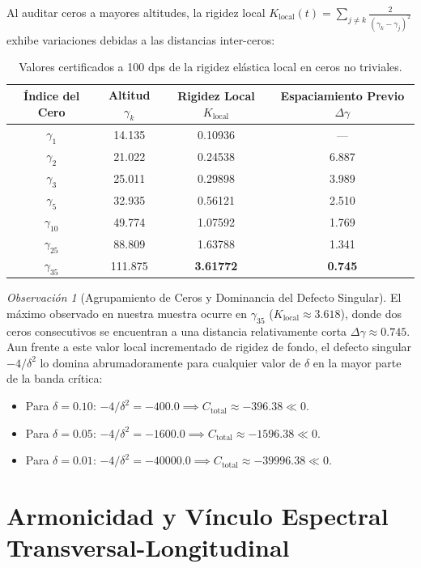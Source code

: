 \documentclass[11pt,a4paper]{article}
\theoremstyle{definition}
\theoremstyle{remark}
\newtheorem{remark}[theorem]{Observación}
\begin{document}
Al auditar ceros a mayores altitudes, la rigidez local $K_{\text{local}}(t) = \sum_{j \neq k} \frac{2}{(\gamma_k - \gamma_j)^2}$ exhibe variaciones debidas a las distancias inter-ceros:
\begin{table}[h!]
\centering
\begin{tabular}{@{}cccc@{}}
\toprule
\textbf{Índice del Cero} & \textbf{Altitud $\gamma_k$} & \textbf{Rigidez Local $K_{\text{local}}$} & \textbf{Espaciamiento Previo $\Delta \gamma$} \\ \midrule
$\gamma_1$  & 14.135 & 0.10936 & --- \\
$\gamma_2$  & 21.022 & 0.24538 & 6.887 \\
$\gamma_3$  & 25.011 & 0.29898 & 3.989 \\
$\gamma_5$  & 32.935 & 0.56121 & 2.510 \\
$\gamma_{10}$ & 49.774 & 1.07592 & 1.769 \\
$\gamma_{25}$ & 88.809 & 1.63788 & 1.341 \\
$\gamma_{35}$ & 111.875 & \textbf{3.61772} & \textbf{0.745} \\ \bottomrule
\end{tabular}
\caption{Valores certificados a 100 dps de la rigidez elástica local en ceros no triviales.}
\end{table}

\begin{remark}[Agrupamiento de Ceros y Dominancia del Defecto Singular]
El máximo observado en nuestra muestra ocurre en $\gamma_{35}$ ($K_{\text{local}} \approx 3.618$), donde dos ceros consecutivos se encuentran a una distancia relativamente corta $\Delta \gamma \approx 0.745$. 
Aun frente a este valor local incrementado de rigidez de fondo, el defecto singular $-4/\delta^2$ lo domina abrumadoramente para cualquier valor de $\delta$ en la mayor parte de la banda crítica:
\begin{itemize}
    \item Para $\delta = 0.10$: $-4/\delta^2 = -400.0 \implies C_{\text{total}} \approx -396.38 \ll 0$.
    \item Para $\delta = 0.05$: $-4/\delta^2 = -1600.0 \implies C_{\text{total}} \approx -1596.38 \ll 0$.
    \item Para $\delta = 0.01$: $-4/\delta^2 = -40000.0 \implies C_{\text{total}} \approx -39996.38 \ll 0$.
\end{itemize}
\end{remark}

\section{Armonicidad y Vínculo Espectral Transversal-Longitudinal}
\end{document}
